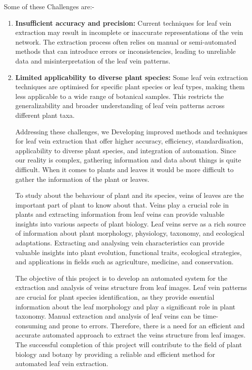 \documentclass{report}
\begin{document}
{Some of these Challenges are:-
\begin{enumerate}[label=\arabic*.]
    \item \textbf{Insufficient accuracy and precision:} Current techniques for leaf vein extraction may result in incomplete or inaccurate representations of the vein network. The extraction process often relies on manual or semi-automated methods that can introduce errors or inconsistencies, leading to unreliable data and misinterpretation of the leaf vein patterns.
    \item \textbf{Limited applicability to diverse plant species:} Some leaf vein extraction techniques are optimised for specific plant species or leaf types, making them less applicable to a wide range of botanical samples. This restricts the generalizability and broader understanding of leaf vein patterns across different plant taxa. 
    
    Addressing these challenges, we Developing improved methods and techniques for leaf vein extraction that offer higher accuracy, efficiency, standardisation, applicability to diverse plant species, and integration of automation. Since our reality is complex, gathering information and data about things is quite difficult. When it comes to plants and leaves it would be more difficult to gather the information of the plant or leaves.
    
    To study about the behaviour of plant and its species, veins of leaves are the important part of plant to know about that. Veins play a crucial role in plants and extracting information from leaf veins can provide valuable insights into various aspects of plant biology. Leaf veins serve as a rich source of information about plant morphology, physiology, taxonomy, and ecological adaptations. Extracting and analysing vein characteristics can provide valuable insights into plant evolution, functional traits, ecological strategies, and applications in fields such as agriculture, medicine, and conservation. 
    
    The objective of this project is to develop an automated system for the extraction and analysis of veins structure from leaf images. Leaf vein patterns are crucial for plant species identification, as they provide essential information about the leaf morphology and play a significant role in plant taxonomy. Manual extraction and analysis of leaf veins can be time-consuming and prone to errors. Therefore, there is a need for an efficient and accurate automated approach to extract the veins structure from leaf images. The successful completion of this project will contribute to the field of plant biology and botany by providing a reliable and efficient method for automated leaf vein extraction. 
    

\end{enumerate}}
\end{document}

